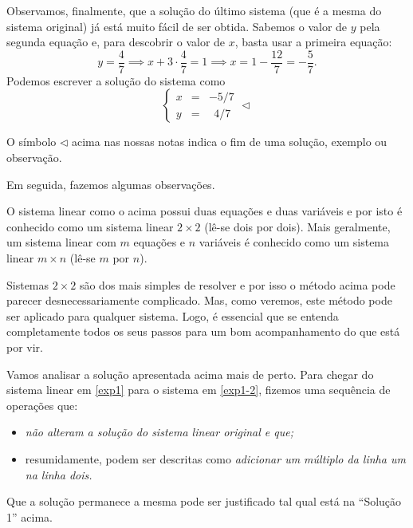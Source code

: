 \documentclass[../livro.tex]{subfiles} %
\begin{document}
\begin{example}
Observamos, finalmente, que a solução do último sistema (que é a mesma do sistema original) já está muito fácil de ser obtida. Sabemos o valor de $y$ pela segunda equação e, para descobrir o valor de $x$, basta usar a primeira equação:
\begin{equation}
y = \frac{4}{7} \implies x + 3\cdot \frac{4}{7} = 1 \implies x = 1 - \frac{12}{7} = - \frac{5}{7}.
\end{equation} Podemos escrever a solução do sistema como
\begin{equation}
  \left\{
    \begin{array}{rcl}
      x&=&-5/7 \\
      y&=& \ \ 4/7
    \end{array}
  \right. \lhd
\end{equation}
\end{example}

O símbolo $\lhd$ acima nas nossas notas indica o fim de uma solução, exemplo ou observação.

Em seguida, fazemos algumas observações.

\begin{remark}
O sistema linear como o acima possui duas equações e duas variáveis e por isto é conhecido como um sistema linear $2\times 2$ (lê-se dois por dois). Mais geralmente, um sistema linear com $m$ equações e $n$ variáveis é conhecido como um sistema linear $m \times n$ (lê-se $m$ por $n$).
\end{remark}

\begin{remark}
Sistemas $2\times 2$ são dos mais simples de resolver e por isso o método acima pode parecer desnecessariamente complicado. Mas, como veremos, este método pode ser aplicado para qualquer sistema. Logo, é essencial que se entenda completamente todos os seus passos para um bom acompanhamento do que está por vir.
\end{remark}

Vamos analisar a solução apresentada acima mais de perto. Para chegar do sistema linear em \eqref{exp1} para o sistema em \eqref{exp1-2}, fizemos uma sequência de operações que:
\begin{itemize}
  \item \emph{não alteram a solução do sistema linear original e que;}
  \item resumidamente, podem ser descritas como \emph{adicionar um múltiplo da linha um na linha dois.}
\end{itemize} Que a solução permanece a mesma pode ser justificado tal qual está na ``Solução 1'' acima.
\end{document}

